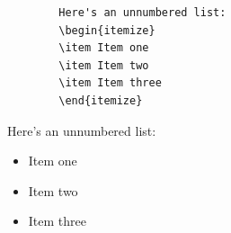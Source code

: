 \documentclass[12pts]{article}
\begin{document}
	\begin{multicols}{2}
		\begin{Verbatim}
		Here's an unnumbered list:
		\begin{itemize}
		\item Item one
		\item Item two
		\item Item three
		\end{itemize}
		\end{Verbatim}
		
		\columnbreak	
		
		Here's an unnumbered list:
		\begin{itemize}
			\item Item one
			\item Item two
			\item Item three
		\end{itemize}
	\end{multicols}
	
\end{document}
